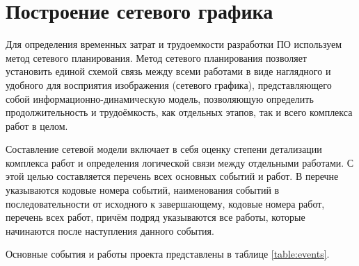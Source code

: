 \section{Построение сетевого графика} \label{net_graph}

Для определения временных затрат и трудоемкости разработки ПО используем метод сетевого планирования. Метод сетевого планирования позволяет установить единой схемой связь между всеми работами в виде наглядного и удобного для восприятия изображения (сетевого графика), представляющего собой информационно-динамическую модель, позволяющую определить продолжительность и трудоёмкость, как отдельных этапов, так и всего комплекса работ в целом.

\vspace{\baselineskip}
Составление сетевой модели включает в себя оценку степени детализации комплекса работ и определения логической связи между отдельными работами.
С этой целью составляется перечень всех основных событий и работ. В перечне указываются кодовые номера событий, наименования событий в последовательности от исходного к завершающему, кодовые номера работ, перечень всех работ, причём подряд указываются все работы, которые начинаются после наступления данного события.

\vspace{\baselineskip}
Основные события и работы проекта представлены в таблице \ref{table:events}.

%   

